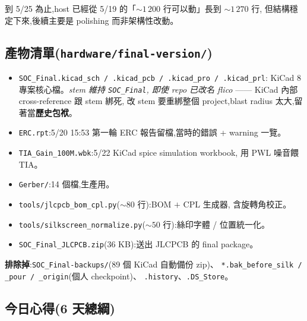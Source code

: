 到 5/25 為止,host 已經從 5/19 的「\(\sim 1\,200\) 行可以動」長到 \(\sim 1\,270\) 行,
但結構穩定下來,後續主要是 polishing 而非架構性改動。

\subsection*{產物清單(\texttt{hardware/final-version/})}

\begin{itemize}[leftmargin=2em,itemsep=0pt]
  \item \texttt{SOC\_Final.kicad\_sch / .kicad\_pcb / .kicad\_pro / .kicad\_prl}:
        KiCad 8 專案核心檔。\emph{stem 維持 \texttt{SOC\_Final},
        即使 repo 已改名 flico} —— KiCad 內部 cross-reference 跟 stem 綁死,
        改 stem 要重綁整個 project,blast radius 太大,留著當\textbf{歷史包袱}。
  \item \texttt{ERC.rpt}:5/20 15:53 第一輪 ERC 報告留檔,當時的錯誤 + warning 一覽。
  \item \texttt{TIA\_Gain\_100M.wbk}:5/22 KiCad spice simulation workbook,
        用 PWL 噪音餵 TIA。
  \item \texttt{Gerber/}:14 個檔,生產用。
  \item \texttt{tools/jlcpcb\_bom\_cpl.py}(\(\sim 80\) 行):BOM \(+\) CPL 生成器,
        含旋轉角校正。
  \item \texttt{tools/silkscreen\_normalize.py}(\(\sim 50\) 行):絲印字體 / 位置統一化。
  \item \texttt{SOC\_Final\_JLCPCB.zip}(36 KB):送出 JLCPCB 的 final package。
\end{itemize}

\textbf{排除掉}:\texttt{SOC\_Final-backups/}(89 個 KiCad 自動備份 zip)、
\texttt{*.bak\_before\_silk / \_pour / \_origin}(個人 checkpoint)、
\texttt{.history}、\texttt{.DS\_Store}。

\subsection*{今日心得(6 天總綱)}

